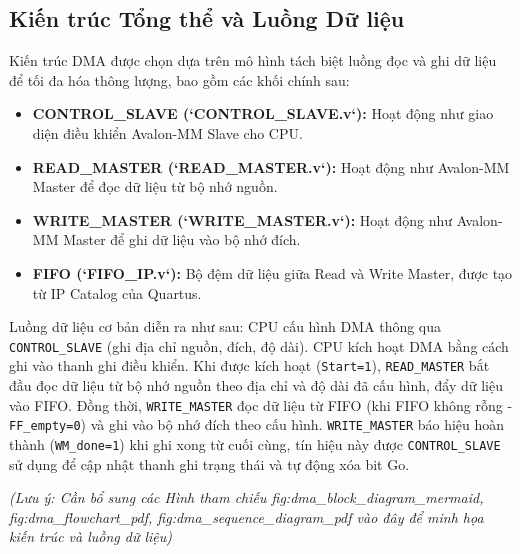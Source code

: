 \subsection{Kiến trúc Tổng thể và Luồng Dữ liệu}
Kiến trúc DMA được chọn dựa trên mô hình tách biệt luồng đọc và ghi dữ liệu để tối đa hóa thông lượng, bao gồm các khối chính sau:
\begin{itemize}
    \item \textbf{CONTROL\_SLAVE (`CONTROL\_SLAVE.v`):} Hoạt động như giao diện điều khiển Avalon-MM Slave cho CPU.
    \item \textbf{READ\_MASTER (`READ\_MASTER.v`):} Hoạt động như Avalon-MM Master để đọc dữ liệu từ bộ nhớ nguồn.
    \item \textbf{WRITE\_MASTER (`WRITE\_MASTER.v`):} Hoạt động như Avalon-MM Master để ghi dữ liệu vào bộ nhớ đích.
    \item \textbf{FIFO (`FIFO\_IP.v`):} Bộ đệm dữ liệu giữa Read và Write Master, được tạo từ IP Catalog của Quartus.
\end{itemize}
Luồng dữ liệu cơ bản diễn ra như sau: CPU cấu hình DMA thông qua \texttt{CONTROL\_SLAVE} (ghi địa chỉ nguồn, đích, độ dài). CPU kích hoạt DMA bằng cách ghi vào thanh ghi điều khiển. Khi được kích hoạt (\texttt{Start=1}), \texttt{READ\_MASTER} bắt đầu đọc dữ liệu từ bộ nhớ nguồn theo địa chỉ và độ dài đã cấu hình, đẩy dữ liệu vào FIFO. Đồng thời, \texttt{WRITE\_MASTER} đọc dữ liệu từ FIFO (khi FIFO không rỗng - \texttt{FF\_empty=0}) và ghi vào bộ nhớ đích theo cấu hình. \texttt{WRITE\_MASTER} báo hiệu hoàn thành (\texttt{WM\_done=1}) khi ghi xong từ cuối cùng, tín hiệu này được \texttt{CONTROL\_SLAVE} sử dụng để cập nhật thanh ghi trạng thái và tự động xóa bit Go.

\textit{(Lưu ý: Cần bổ sung các Hình tham chiếu fig:dma\_block\_diagram\_mermaid, fig:dma\_flowchart\_pdf, fig:dma\_sequence\_diagram\_pdf vào đây để minh họa kiến trúc và luồng dữ liệu)}

